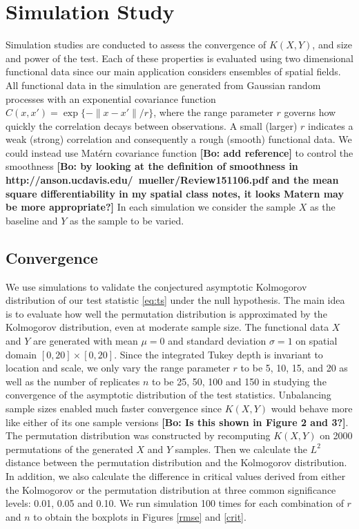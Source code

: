 \documentclass[12pt]{article}
\newcommand{\bl}[1]{\color{Red}\textbf{[Bo: #1]}\normalcolor}
\begin{document}
\section{Simulation Study} \label{sims}
Simulation studies are conducted to assess the convergence of $K(X, Y)$,  and size and power of the test. 
Each of these properties is evaluated using two dimensional functional data since our main application considers ensembles of spatial fields. All functional data in the simulation are generated from Gaussian random processes with an exponential covariance function $C(x, x') = \exp\{-\|x - x'\|/r \}$, where the range parameter $r$ governs how quickly the correlation decays between observations. A small (larger) $r$ indicates a weak (strong) correlation and consequently a rough (smooth) functional data.  We could instead use Mat\'ern covariance function \bl{add reference} to control the smoothness \bl{by looking at the definition of smoothness in http://anson.ucdavis.edu/~mueller/Review151106.pdf and the mean square differentiability in my spatial class notes, it looks Matern may be more appropriate?}
In each simulation we consider the sample $X$ as the baseline and $Y$ as the sample to be varied. 

\subsection{Convergence} \label{sec:conv}
We use simulations to validate the conjectured asymptotic Kolmogorov distribution of our test statistic \ref{eq:ts} under the null hypothesis. The main idea is to evaluate how well the permutation distribution is approximated by the Kolmogorov distribution, even at moderate sample size.  The functional data $X$ and $Y$ are generated with mean $\mu = 0$ and standard deviation $\sigma = 1$ on spatial domain $[0, 20] \times [0, 20]$. Since the integrated Tukey depth is invariant to location and scale, we only vary the range parameter $r$ to be 5, 10, 15, and 20 as well as the number of replicates $n$ to be 25, 50, 100 and 150 in studying the convergence of the asymptotic distribution of the test statistics. 
Unbalancing sample sizes enabled much faster convergence since $K(X, Y)$ would behave more like either of its one sample versions \bl{Is this shown in Figure 2 and 3?}. 
The permutation distribution was constructed by recomputing $K(X, Y)$ on 2000 permutations of the generated $X$ and $Y$ samples. Then we calculate the $L^2$ distance between the permutation distribution and the Kolmogorov distribution. In addition, we also calculate the difference in critical values derived from either the Kolmogorov or the permutation distribution at three common significance levels: 0.01, 0.05 and 0.10. 
We run simulation 100 times for each combination of $r$ and $n$ to obtain the boxplots in Figures \ref{rmse} and \ref{crit}.
\end{document}

